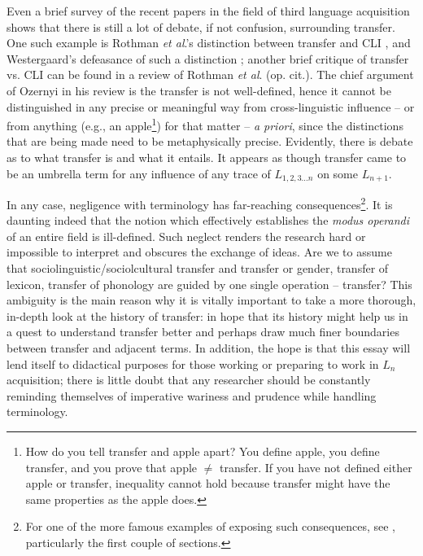 \documentclass{article}
\begin{document}
Even a brief survey of the recent papers in the field of third language acquisition shows that there is still a lot of debate, if not confusion, surrounding transfer. One such example is Rothman \textit{et al}.’s distinction between transfer and CLI \citep{rothman_third_2019}, and Westergaard’s defeasance of such a distinction \citep[][p. 104]{westergaard_plausibility_2021}; another brief critique of transfer vs. CLI can be found in a review \citep{ozernyi_jason_2021} of Rothman \textit{et al}. (op. cit.). The chief argument of Ozernyi in his review is the transfer is not well-defined, hence it cannot be distinguished in any precise or meaningful way from cross-linguistic influence -- or from anything (e.g., an apple\footnote{How do you tell transfer and apple apart? You define apple, you define transfer, and you prove that apple \(\neq\) transfer. If you have not defined either apple or transfer, inequality cannot hold because transfer might have the same properties as the apple does.}) for that matter -- \textit{a priori}, since the distinctions that are being made need to be metaphysically precise. Evidently, there is debate as to what transfer is and what it entails. It appears as though transfer came to be an umbrella term for any influence of any trace of \(L_{1,2,3...n}\) on some \(L_{n+1}\). 

In any case, negligence with terminology has far-reaching consequences\footnote{For one of the more famous examples of exposing such consequences, see \cite{chomsky_review_1959}, particularly the first couple of sections.}. It is daunting indeed that the notion which effectively establishes the \textit{modus operandi} of an entire field is ill-defined. Such neglect renders the research hard or impossible to interpret and obscures the exchange of ideas. Are we to assume that sociolinguistic/sociolcultural transfer \citep[e.g.,][]{fouser_too_2001} and transfer or gender, transfer of lexicon, transfer of phonology are guided by one single operation -- transfer? This ambiguity is the main reason why it is vitally important to take a more thorough, in-depth look at the history of transfer: in hope that its history might help us in a quest to understand transfer better and perhaps draw much finer boundaries between transfer and adjacent terms. In addition, the hope is that this essay will lend itself to didactical purposes for those working or preparing to work in \(L_n\) acquisition; there is little doubt that any researcher should be constantly reminding themselves of imperative wariness and prudence while handling terminology.
\end{document}
